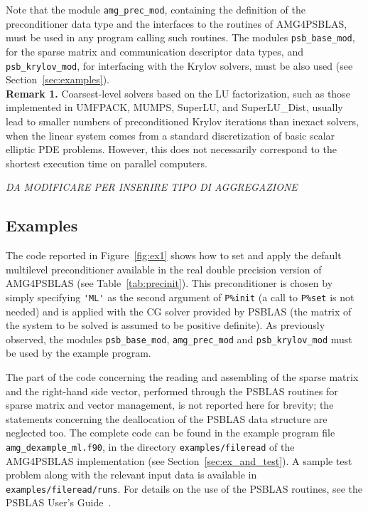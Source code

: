 Note that the module \verb|amg_prec_mod|, containing the definition of the
preconditioner data type and the interfaces to the routines of AMG4PSBLAS,
must be used in any program calling such routines.
The modules \verb|psb_base_mod|, for the sparse matrix and communication descriptor
data types, and \verb|psb_krylov_mod|, for interfacing with the
Krylov solvers, must be also used (see Section~\ref{sec:examples}). \\

\textbf{Remark 1.} Coarsest-level solvers based on the LU factorization,
such as those implemented in UMFPACK, MUMPS, SuperLU, and SuperLU\_Dist,
usually lead to smaller numbers of preconditioned Krylov
iterations than inexact solvers, when the linear system comes from
a standard discretization of basic scalar elliptic PDE problems. However,
this does not necessarily correspond to the shortest execution time
on parallel computers.


{\em DA MODIFICARE PER INSERIRE TIPO DI AGGREGAZIONE}

\subsection{Examples\label{sec:examples}}

The code reported in Figure~\ref{fig:ex1} shows how to set and apply the default
multilevel preconditioner available in the real double precision version
of AMG4PSBLAS (see Table~\ref{tab:precinit}). This preconditioner is chosen
by simply specifying \verb|'ML'| as the second argument of \verb|P%init|
(a call to \verb|P%set| is not needed) and is applied with the CG
solver provided by PSBLAS (the matrix of the system to be solved is
assumed to be positive definite). As previously observed, the modules
\verb|psb_base_mod|, \verb|amg_prec_mod| and \verb|psb_krylov_mod|
must be used by the example program.

The part of the code concerning the
reading and assembling of the sparse matrix and the right-hand side vector, performed
through the PSBLAS routines for sparse matrix and vector management, is not reported
here for brevity; the statements concerning the deallocation of the PSBLAS
data structure are neglected too.
The complete code can be found in the example program file \verb|amg_dexample_ml.f90|,
in the directory \verb|examples/fileread| of the AMG4PSBLAS implementation (see
Section~\ref{sec:ex_and_test}). A sample test problem along with the relevant
input data is available in \verb|examples/fileread/runs|.
For details on the use of the PSBLAS routines, see the PSBLAS User's
Guide~\cite{PSBLASGUIDE}.

